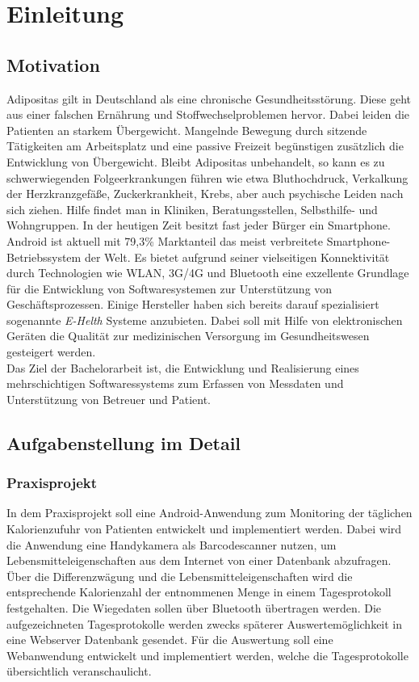 
\chapter{Einleitung} 

\section{Motivation}

Adipositas gilt in Deutschland als eine chronische Gesundheitsst\"orung.
Diese geht aus einer falschen Ern\"ahrung und Stoffwechselproblemen hervor.
Dabei leiden die Patienten an starkem \"Ubergewicht.
Mangelnde Bewegung durch sitzende T\"atigkeiten am Arbeitsplatz und eine passive Freizeit beg\"unstigen zus\"atzlich die Entwicklung von \"Ubergewicht.
Bleibt Adipositas unbehandelt, so kann es  zu schwerwiegenden Folgeerkrankungen f\"uhren wie etwa Bluthochdruck,
Verkalkung der Herzkranzgef\"a\ss{}e, Zuckerkrankheit, Krebs, aber auch psychische Leiden nach sich ziehen.
Hilfe findet man in Kliniken, Beratungsstellen, Selbsthilfe- und Wohngruppen.
In der heutigen Zeit besitzt fast jeder B\"urger ein Smartphone.
Android ist aktuell mit 79,3\% Marktanteil\cite{AndroidAnteile:01}  das meist verbreitete Smartphone-Betriebssystem der Welt.
Es bietet aufgrund seiner vielseitigen Konnektivit\"at durch Technologien wie WLAN, 3G/4G und Bluetooth 
eine exzellente Grundlage f\"ur die Entwicklung von Softwaresystemen zur Unterst\"utzung von Gesch\"aftsprozessen.
Einige Hersteller haben sich bereits darauf spezialisiert sogenannte \emph{E-Helth} Systeme anzubieten.
Dabei soll mit Hilfe von elektronischen Ger\"aten die Qualit\"at zur medizinischen Versorgung im Gesundheitswesen gesteigert werden. \\
Das Ziel der Bachelorarbeit ist, die Entwicklung und Realisierung eines mehrschichtigen Softwaressystems
zum Erfassen von Messdaten und Unterst\"utzung von Betreuer und Patient.




\section{Aufgabenstellung im Detail}

\subsection*{Praxisprojekt}

In dem Praxisprojekt soll eine Android-Anwendung zum Monitoring der t\"aglichen Kalorienzufuhr von Patienten entwickelt und implementiert werden.
Dabei wird die Anwendung eine Handykamera als Barcodescanner nutzen, um Lebensmitteleigenschaften aus dem Internet von einer Datenbank abzufragen.
\"Uber die Differenzw\"agung und die Lebensmitteleigenschaften wird die entsprechende Kalorienzahl der entnommenen Menge
in einem Tagesprotokoll festgehalten.
Die Wiegedaten sollen \"uber Bluetooth \"ubertragen werden. 
Die aufgezeichneten Tagesprotokolle werden zwecks sp\"aterer Auswertem\"oglichkeit in eine Webserver Datenbank gesendet.
F\"ur die Auswertung soll eine Webanwendung entwickelt und implementiert werden, welche die Tagesprotokolle \"ubersichtlich veranschaulicht.


